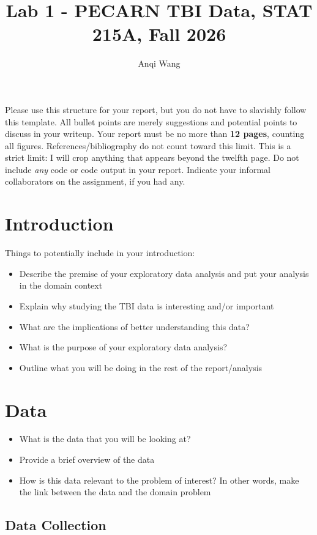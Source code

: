\documentclass[10pt,letterpaper]{article}
\title{Lab 1 - PECARN TBI Data, STAT 215A, Fall 2026}
\author{Anqi Wang}
\begin{document}
\maketitle

Please use this structure for your report, but you do not have to
slavishly follow this template. All bullet points are merely suggestions
and potential points to discuss in your writeup. Your report must be
no more than \textbf{12 pages}, counting all figures. References/bibliography do not count toward this limit. This is a strict limit: I will crop anything that appears beyond the twelfth page. Do not include \emph{any} code
or code output in your report. Indicate your informal collaborators on
the assignment, if you had any.

\section{Introduction}\label{introduction}

Things to potentially include in your introduction:

\begin{itemize}
\item Describe the premise of your exploratory data analysis and put your analysis in the domain context
\item Explain why studying the TBI data is interesting and/or important
\item What are the implications of better understanding this data?
\item What is the purpose of your exploratory data analysis?
\item Outline what you will be doing in the rest of the report/analysis
\end{itemize}


\section{Data}\label{data}

\begin{itemize}
\item What is the data that you will be looking at?
\item Provide a brief overview of the data
\item How is this data relevant to the problem of interest? In other words, make the link between the data and the domain problem
\end{itemize}

\subsection{Data Collection}\label{data-collection}
\end{document}

